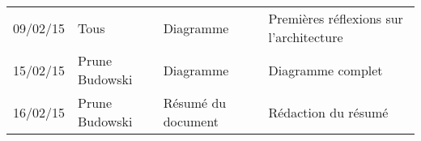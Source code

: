 \small
\begin{tabular}{|p{1.5cm}| >{\raggedright}p{2.5cm}|p{2.5cm}|p{8.5cm}|}
  \hline
  \rowcolor{Gainsboro} \color{Navy}{\bfseries Date}  & \color{Navy}{\bfseries Auteur} & \color{Navy}{\bfseries Section(s)}  &\color{Navy}{\bfseries Commentaires} \\
  \hline
  09/02/15 & Tous & Diagramme & Premières réflexions sur l'architecture\\
  \hline
  15/02/15 & Prune Budowski & Diagramme & Diagramme complet\\
  \hline
  16/02/15 & Prune Budowski & Résumé du document & Rédaction du résumé\\
  \hline
\end{tabular}
\normalsize
